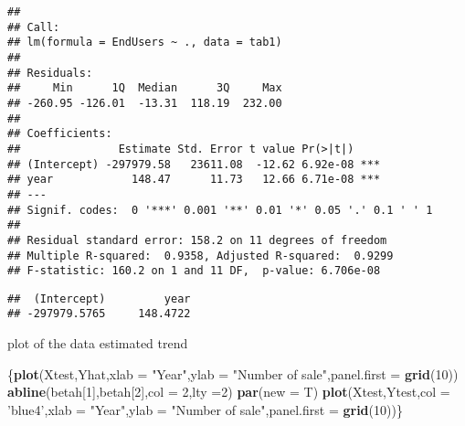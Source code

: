 \documentclass[
]{article}
\newenvironment{Shaded}{\begin{snugshade}}{\end{snugshade}}
\newcommand{\CommentTok}[1]{\textcolor[rgb]{0.56,0.35,0.01}{\textit{#1}}}
\newcommand{\DataTypeTok}[1]{\textcolor[rgb]{0.13,0.29,0.53}{#1}}
\newcommand{\DecValTok}[1]{\textcolor[rgb]{0.00,0.00,0.81}{#1}}
\newcommand{\KeywordTok}[1]{\textcolor[rgb]{0.13,0.29,0.53}{\textbf{#1}}}
\newcommand{\NormalTok}[1]{#1}
\newcommand{\OperatorTok}[1]{\textcolor[rgb]{0.81,0.36,0.00}{\textbf{#1}}}
\newcommand{\StringTok}[1]{\textcolor[rgb]{0.31,0.60,0.02}{#1}}
\begin{document}
\begin{verbatim}
## 
## Call:
## lm(formula = EndUsers ~ ., data = tab1)
## 
## Residuals:
##     Min      1Q  Median      3Q     Max 
## -260.95 -126.01  -13.31  118.19  232.00 
## 
## Coefficients:
##               Estimate Std. Error t value Pr(>|t|)    
## (Intercept) -297979.58   23611.08  -12.62 6.92e-08 ***
## year            148.47      11.73   12.66 6.71e-08 ***
## ---
## Signif. codes:  0 '***' 0.001 '**' 0.01 '*' 0.05 '.' 0.1 ' ' 1
## 
## Residual standard error: 158.2 on 11 degrees of freedom
## Multiple R-squared:  0.9358, Adjusted R-squared:  0.9299 
## F-statistic: 160.2 on 1 and 11 DF,  p-value: 6.706e-08
\end{verbatim}

\begin{Shaded}
\end{Shaded}

\begin{verbatim}
##  (Intercept)         year 
## -297979.5765     148.4722
\end{verbatim}

\begin{Shaded}
\end{Shaded}

plot of the data estimated trend

\begin{Shaded}
\begin{Highlighting}[]
\NormalTok{\{}\KeywordTok{plot}\NormalTok{(Xtest,Yhat,}\DataTypeTok{xlab =} \StringTok{"Year"}\NormalTok{,}\DataTypeTok{ylab =} \StringTok{"Number of sale"}\NormalTok{,}\DataTypeTok{panel.first =} \KeywordTok{grid}\NormalTok{(}\DecValTok{10}\NormalTok{)) }
\KeywordTok{abline}\NormalTok{(betah[}\DecValTok{1}\NormalTok{],betah[}\DecValTok{2}\NormalTok{],}\DataTypeTok{col =} \DecValTok{2}\NormalTok{,}\DataTypeTok{lty =}\DecValTok{2}\NormalTok{)}
\KeywordTok{par}\NormalTok{(}\DataTypeTok{new =}\NormalTok{ T)}
\KeywordTok{plot}\NormalTok{(Xtest,Ytest,}\DataTypeTok{col =} \StringTok{'blue4'}\NormalTok{,}\DataTypeTok{xlab =} \StringTok{"Year"}\NormalTok{,}\DataTypeTok{ylab =} \StringTok{"Number of sale"}\NormalTok{,}\DataTypeTok{panel.first =} \KeywordTok{grid}\NormalTok{(}\DecValTok{10}\NormalTok{))\}}
\end{Highlighting}
\end{Shaded}
\end{document}
